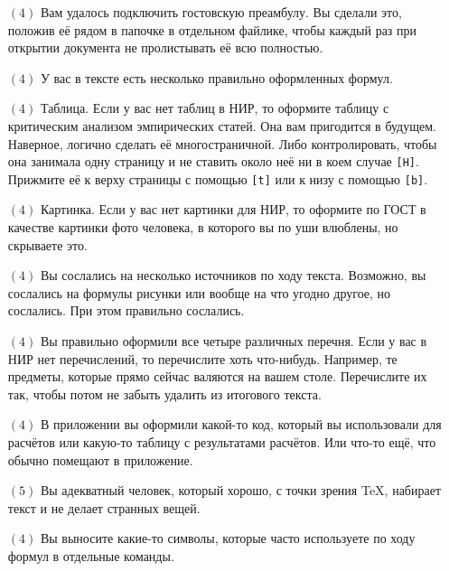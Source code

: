 \documentclass[12pt, a4paper, oneside]{article}
\begin{document}
\begin{itemize}
\item[$(4)$] Вам удалось подключить гостовскую преамбулу. Вы сделали это, положив её рядом в папочке в отдельном файлике, чтобы каждый раз при открытии документа не пролистывать её всю полностью. 
	
\item[$(4)$]  У вас в тексте есть несколько правильно оформленных формул.

\item[$(4)$]  Таблица. Если у вас нет таблиц в НИР, то оформите таблицу с критическим анализом эмпирических статей. Она вам пригодится в будущем. Наверное, логично сделать её многостраничной. Либо контролировать, чтобы она занимала одну страницу и не ставить около неё ни в коем случае \texttt{[H]}. Прижмите её к верху страницы с помощью \texttt{[t]} или к низу с помощью \texttt{[b]}.

\item[$(4)$]  Картинка. Если у вас нет картинки для НИР, то оформите по ГОСТ в качестве картинки фото человека, в которого вы по уши влюблены, но скрываете это.

\item[$(4)$]  Вы сослались на несколько источников по ходу текста. Возможно, вы сослались на формулы рисунки или вообще на что угодно другое, но сослались. При этом правильно сослались.

\item[$(4)$]  Вы правильно оформили все четыре различных перечня. Если у вас в НИР нет перечислений, то перечислите хоть что-нибудь. Например, те предметы, которые прямо сейчас валяются на вашем столе. Перечислите их так, чтобы потом не забыть удалить из итогового текста.

\item[$(4)$]  В приложении вы оформили какой-то код, который вы использовали для расчётов или какую-то таблицу с результатами расчётов. Или что-то ещё, что обычно помещают в приложение.

\item[$(5)$]  Вы адекватный человек, который хорошо, с точки зрения TeX, набирает текст и не делает странных вещей. 

\item[$(4)$]  Вы выносите какие-то символы, которые часто используете по ходу формул в отдельные команды. 
\end{itemize} 
\end{document}

